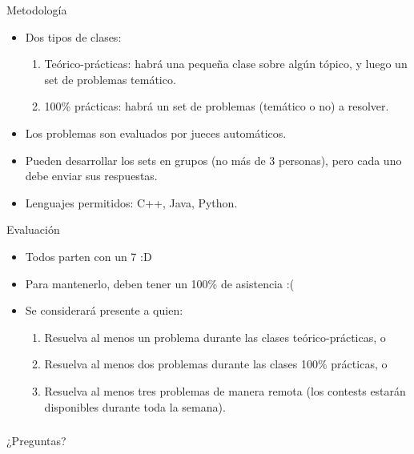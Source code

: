 \documentclass[mathserif,handout]{beamer}
\begin{document}
\begin{frame}{Metodología}
  \begin{itemize}
    \item Dos tipos de clases:\pause
    \begin{enumerate}
      \item Teórico-prácticas: habrá una pequeña clase sobre algún tópico, y luego un set de problemas temático.\pause
      \item 100\% prácticas: habrá un set de problemas (temático o no) a resolver.\pause
    \end{enumerate}

      \item Los problemas son evaluados por jueces automáticos.\pause
      \item Pueden desarrollar los sets en grupos (no más de 3 personas), pero cada uno debe enviar sus respuestas.\pause
      \item Lenguajes permitidos: C++, Java, Python.
\end{itemize}
\end{frame}

\begin{frame}{Evaluación}
  \begin{itemize}
      \item Todos parten con un 7 :D\pause
      \item Para mantenerlo, deben tener un 100\% de asistencia :(\pause
      \item Se considerará presente a quien:\pause
      \begin{enumerate}
        \item Resuelva al menos un problema durante las clases teórico-prácticas, o\pause
        \item Resuelva al menos dos problemas durante las clases 100\% prácticas, o\pause
        \item Resuelva al menos tres problemas de manera remota (los contests estarán disponibles durante toda la semana).
      \end{enumerate}
\end{itemize}
\end{frame}

\begin{frame}
  \frametitle{}
  \begin{center}
    \huge ¿Preguntas?
  \end{center}
\end{frame}

{
	\frame{\titlepage}
}
\end{document}
